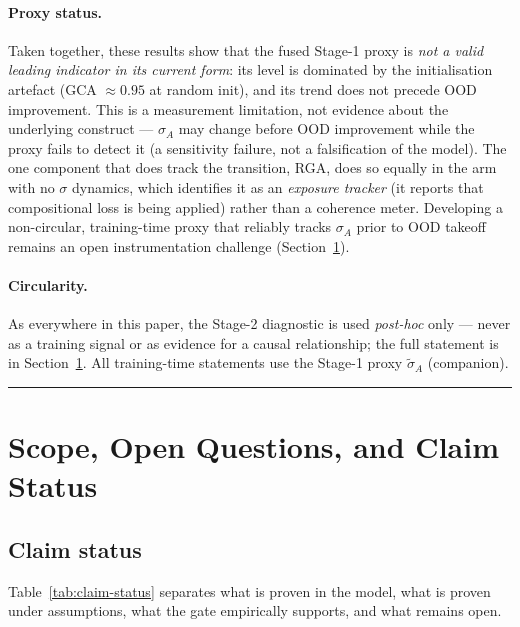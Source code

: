 \documentclass{article}
\theoremstyle{definition}
\begin{document}
\paragraph*{Proxy status.}
Taken together, these results show that the fused Stage-1 proxy is
\emph{not a valid leading indicator in its current form}: its level is
dominated by the initialisation artefact (GCA $\approx 0.95$ at
random init), and its trend does not precede OOD improvement. This is a
measurement limitation, not evidence about the underlying construct ---
$\sigma_A$ may change before OOD improvement while the proxy fails to
detect it (a sensitivity failure, not a falsification of the model). The
one component that does track the transition, RGA, does so equally in
the arm with no $\sigma$ dynamics, which identifies it as an
\emph{exposure tracker} (it reports that compositional loss is being
applied) rather than a coherence meter. Developing a non-circular,
training-time proxy that reliably tracks $\sigma_A$ prior to OOD takeoff
remains an open instrumentation challenge (Section~\ref{sec:limitations}).

\paragraph*{Circularity.}
As everywhere in this paper, the Stage-2 diagnostic is used
\emph{post-hoc} only --- never as a training signal or as evidence for
a causal relationship; the full statement is in
Section~\ref{sec:limitations}. All training-time statements use the
Stage-1 proxy $\tilde{\sigma}_A$ (companion).

\noindent\rule{\linewidth}{0.4pt}

\section{Scope, Open Questions, and Claim Status}\label{sec:limitations}

\subsection{Claim status}\label{sec:claim-status}

Table~\ref{tab:claim-status} separates what is proven in the model,
what is proven under assumptions, what the gate empirically supports,
and what remains open.
\end{document}
